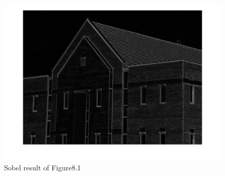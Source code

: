 \documentclass[11pt,oneside]{book}
\begin{document}
\begin{figure}[!htb]
   \centering  
   \includegraphics[width=1\textwidth]{images/9/sobel.jpg}
   \caption{Sobel result of Figure8.1}
\end{figure}
\end{document}
